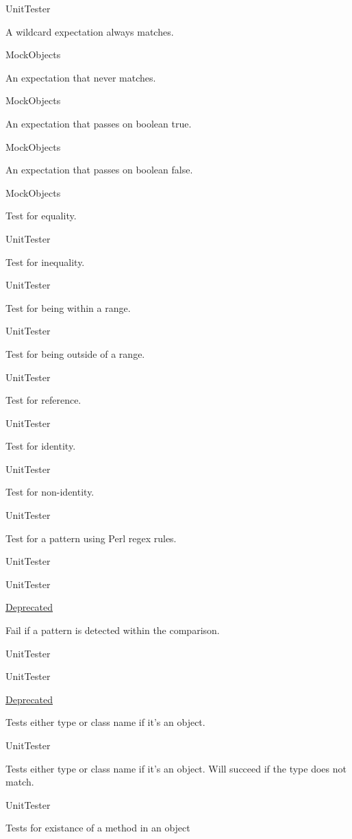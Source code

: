 UnitTester 

A wildcard expectation always matches.

MockObjects

An expectation that never matches.

MockObjects

An expectation that passes on boolean true.

MockObjects

An expectation that passes on boolean false.

MockObjects

Test for equality.

UnitTester

Test for inequality.

UnitTester

Test for being within a range.

UnitTester

Test for being outside of a range.

UnitTester

Test for reference.

UnitTester

Test for identity.

UnitTester

Test for non-\/identity.

UnitTester

Test for a pattern using Perl regex rules.

UnitTester

UnitTester \begin{Desc}
\item[\hyperlink{deprecated__deprecated000004}{Deprecated}]\end{Desc}


Fail if a pattern is detected within the comparison.

UnitTester

UnitTester \begin{Desc}
\item[\hyperlink{deprecated__deprecated000005}{Deprecated}]\end{Desc}


Tests either type or class name if it's an object.

UnitTester

Tests either type or class name if it's an object. Will succeed if the type does not match.

UnitTester

Tests for existance of a method in an object

